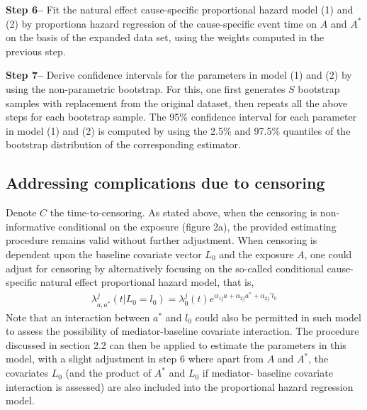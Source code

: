 \documentclass[AMA,STIX1COL]{WileyNJD-v2}
\begin{document}
\textbf{Step 6--}  Fit the natural effect cause-specific proportional hazard model (1) and (2) by proportiona hazard regression of the cause-specific event time on $A$ and $A^*$ on the basis of the expanded data set, using the weights computed in the previous step. 

\textbf{Step 7--}  Derive confidence intervals for the parameters in model (1) and (2) by using the non-parametric bootstrap. For this, one first generates $S$ bootstrap samples with replacement from the original dataset, then repeats all the above steps for each bootstrap sample. The 95\% confidence interval for each parameter in model (1) and (2) is computed by using the 2.5\% and 97.5\% quantiles of the bootstrap distribution of the corresponding estimator.

\subsection{Addressing complications due to censoring}
Denote $C$ the time-to-censoring. As stated above, when the censoring is non-informative conditional on the exposure (figure 2a), the provided estimating procedure remains valid without further adjustment. When censoring is dependent upon the baseline covariate vector $L_0$ and the exposure $A$, one could adjust for censoring by alternatively focusing on the so-called conditional cause-specific natural effect proportional hazard model, that is,
\begin{align}
\lambda^j_{a, a^*}(t|L_0 = l_0) = \lambda_0^j(t)e^{\alpha_{1j}a + \alpha_{2j}a^* + \alpha_{2j}'l_0}
\end{align}
Note that an interaction between $a^*$ and $l_0$ could also be permitted in such model to assess the possibility of mediator-baseline covariate interaction. The procedure discussed in section 2.2 can then be applied to estimate the parameters in this model, with a slight adjustment in step 6 where apart from $A$ and $A^*$, the covariates $L_0$ (and the product of $A^*$ and $L_0$ if mediator- baseline covariate interaction is assessed) are also included into the proportional hazard regression model.
\end{document}
